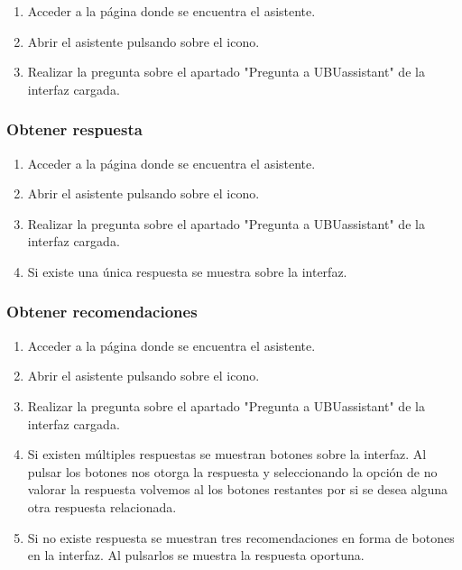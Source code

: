 \begin{enumerate}
\item Acceder a la página donde se encuentra el asistente.
\item Abrir el asistente pulsando sobre el icono.
\item Realizar la pregunta sobre el apartado "Pregunta a UBUassistant" de la interfaz cargada.
\end{enumerate}

\subsubsection{Obtener respuesta}

\begin{enumerate}
\item Acceder a la página donde se encuentra el asistente.
\item Abrir el asistente pulsando sobre el icono.
\item Realizar la pregunta sobre el apartado "Pregunta a UBUassistant" de la interfaz cargada.
\item Si existe una única respuesta se muestra sobre la interfaz.
\end{enumerate}

\subsubsection{Obtener recomendaciones}

\begin{enumerate}
\item Acceder a la página donde se encuentra el asistente.
\item Abrir el asistente pulsando sobre el icono.
\item Realizar la pregunta sobre el apartado "Pregunta a UBUassistant" de la interfaz cargada.
\item Si existen múltiples respuestas se muestran botones sobre la interfaz.
Al pulsar los botones nos otorga la respuesta y seleccionando la opción de no valorar la respuesta volvemos al los botones restantes por si se desea alguna otra respuesta relacionada.

\item Si no existe respuesta se muestran tres recomendaciones en forma de botones en la interfaz.
Al pulsarlos se muestra la respuesta oportuna.

\end{enumerate}

